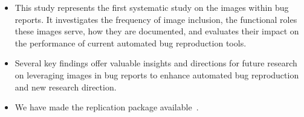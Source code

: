 \begin{itemize}

    \item This study represents the first systematic study on the images within bug reports. It investigates the frequency of image inclusion, the functional roles these images serve, how they are documented, and evaluates their impact on the performance of current automated bug reproduction tools.
    
    \item Several key findings offer valuable insights and directions for future research on leveraging images in bug reports to enhance automated bug reproduction and new research direction.

    
    \item We have made the replication package available~\cite{replication}.
\end{itemize}

 


 